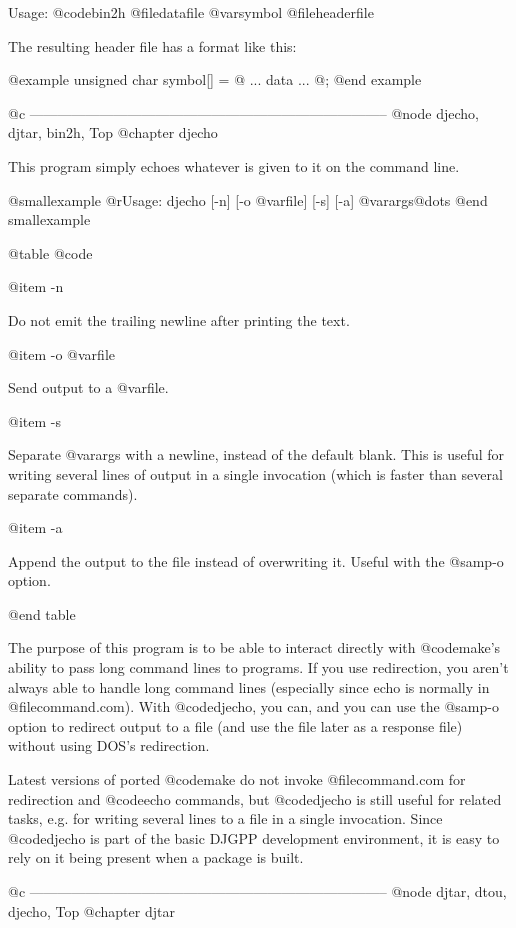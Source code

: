 Usage: @code{bin2h} @file{datafile} @var{symbol} @file{headerfile}

The resulting header file has a format like this:

@example
unsigned char symbol[] = @{
  ... data ...
@};
@end example

@c -----------------------------------------------------------------------------
@node djecho, djtar, bin2h, Top
@chapter djecho

This program simply echoes whatever is given to it on the command line.

@smallexample
 @r{Usage:} djecho [-n] [-o @var{file}] [-s] [-a] @var{args}@dots{}
@end smallexample

@table @code

@item -n

Do not emit the trailing newline after printing the text.

@item -o @var{file}

Send output to a @var{file}.

@item -s

Separate @var{args} with a newline, instead of the default blank.  This
is useful for writing several lines of output in a single invocation
(which is faster than several separate commands).

@item -a

Append the output to the file instead of overwriting it.  Useful with
the @samp{-o} option.

@end table

The purpose of this program is to be able to interact directly with
@code{make}'s ability to pass long command lines to programs.  If you
use redirection, you aren't always able to handle long command lines
(especially since echo is normally in @file{command.com}).  With
@code{djecho}, you can, and you can use the @samp{-o} option to redirect
output to a file (and use the file later as a response file) without
using DOS's redirection.

Latest versions of ported @code{make} do not invoke @file{command.com}
for redirection and @code{echo} commands, but @code{djecho} is still
useful for related tasks, e.g. for writing several lines to a file in a
single invocation.  Since @code{djecho} is part of the basic DJGPP
development environment, it is easy to rely on it being present when a
package is built.

@c -----------------------------------------------------------------------------
@node djtar, dtou, djecho, Top
@chapter djtar

